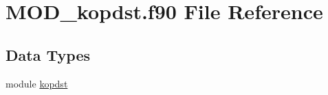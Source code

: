 \hypertarget{MOD__kopdst_8f90}{\section{M\-O\-D\-\_\-kopdst.\-f90 File Reference}
\label{MOD__kopdst_8f90}
}
\subsection*{Data Types}
\begin{DoxyCompactItemize}
\item 
module \hyperlink{classkopdst}{kopdst}
\end{DoxyCompactItemize}
